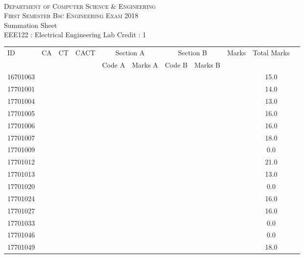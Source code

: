 \documentclass[12pt]{article}
\begin{document}
    \centering
    \begin{minipage}[m]{.8\textwidth} \centering 
	\smallskip
	\\
	\textsc{Department of Computer Science \& Engineering}\\
	\textsc{ First Semester Bsc Engineering Exam 2018}\\
    {\large {\sc Summation Sheet}}\\  
     {\centering EEE122 : Electrical Engineering Lab     Credit : 1 } \\
    \end{minipage} 
    \begin{center} 
	\renewcommand{\arraystretch}{1.08}
	\begin{small}
    \begin{tabular}{|l|c|c|c|c|c|c|c|c|c|c|} \hline
	\multirow{2}{*}{ID} & 	\multirow{2}{*}{CA}  & 	\multirow{2}{*}{CT}  & 	\multirow{2}{*}{CACT}  & \multicolumn{2 }{c|}{Section A}& \multicolumn{2 }{c|}{Section B} & 	\multirow{2}{*}{Marks}  & 	\multirow{2}{*}{Total Marks}  \\ 
	&  &  &  & Code A & Marks A & Code B & Marks B&  &  \\ \hline
16701063 &  &  &  &  &  &  &  &  & 15.0\\ \hline 
17701001 &  &  &  &  &  &  &  &  & 14.0\\ \hline 
17701004 &  &  &  &  &  &  &  &  & 13.0\\ \hline 
17701005 &  &  &  &  &  &  &  &  & 16.0\\ \hline 
17701006 &  &  &  &  &  &  &  &  & 16.0\\ \hline 
17701007 &  &  &  &  &  &  &  &  & 18.0\\ \hline 
17701009 &  &  &  &  &  &  &  &  & 0.0\\ \hline 
17701012 &  &  &  &  &  &  &  &  & 21.0\\ \hline 
17701013 &  &  &  &  &  &  &  &  & 13.0\\ \hline 
17701020 &  &  &  &  &  &  &  &  & 0.0\\ \hline 
17701024 &  &  &  &  &  &  &  &  & 16.0\\ \hline 
17701027 &  &  &  &  &  &  &  &  & 16.0\\ \hline 
17701033 &  &  &  &  &  &  &  &  & 0.0\\ \hline 
17701046 &  &  &  &  &  &  &  &  & 0.0\\ \hline 
17701049 &  &  &  &  &  &  &  &  & 18.0\\ \hline 

\end{tabular}
\end{small}
\end{center}
\end{document}
